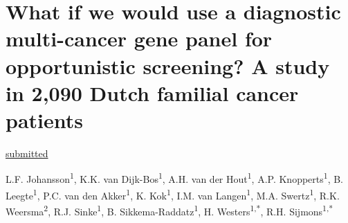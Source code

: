 \chapter[What if we would use a diagnostic multi-cancer gene panel for opportunistic screening? A study in 2,090 Dutch familial cancer patients]{What if we would use a diagnostic multi-cancer gene panel for opportunistic screening? A study in 2,090 Dutch familial cancer patients}
\label{chap:Opportunistic_screening}

{ \Large {} }

\hfill \underline{submitted} 


\newpage

\noindent
L.F. Johansson\textsuperscript{1}, K.K. van Dijk-Bos\textsuperscript{1}, A.H. van der Hout\textsuperscript{1}, A.P. Knopperts\textsuperscript{1}, B. Leegte\textsuperscript{1}, P.C. van den Akker\textsuperscript{1}, K. Kok\textsuperscript{1}, I.M. van Langen\textsuperscript{1}, M.A. Swertz\textsuperscript{1}, R.K. Weersma\textsuperscript{2}, R.J. Sinke\textsuperscript{1}, B. Sikkema-Raddatz\textsuperscript{1}, H. Westers\textsuperscript{1,*}, R.H. Sijmons\textsuperscript{1,*}\\


